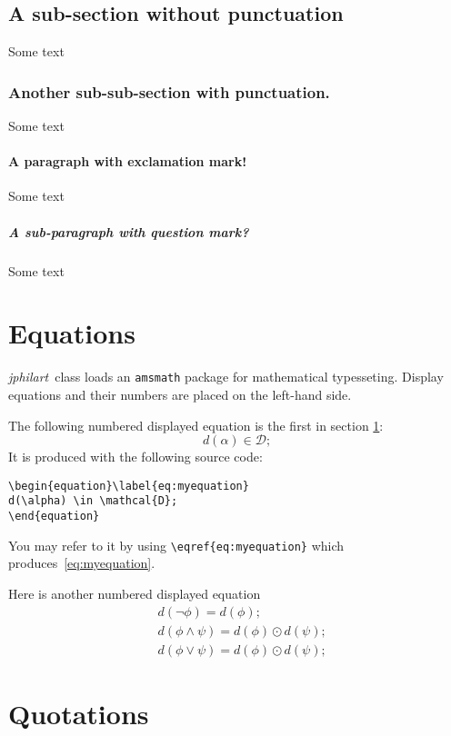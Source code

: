 \documentclass{jphilart}
\newcommand{\jphilart}{\emph{jphilart}\ } %
\begin{document}
\subsection{A sub-section without punctuation} Some text

\subsubsection{Another sub-sub-section with punctuation.} Some text

\paragraph{A paragraph with exclamation mark!} Some text

\subparagraph{A sub-paragraph with question mark?} Some text

\section{Equations}\label{se:mysection}

\jphilart class loads an \texttt{amsmath} package for mathematical typesseting.
Display equations and their numbers are placed on the left-hand side.

The following numbered displayed equation is the first in section \ref{se:mysection}:%
\begin{equation}\label{eq:myequation}
d(\alpha) \in \mathcal{D};
\end{equation}
It is produced with the following source code:
\begin{verbatim}
\begin{equation}\label{eq:myequation}
d(\alpha) \in \mathcal{D};
\end{equation}\end{verbatim}
You may refer to it by using \verb+\eqref{eq:myequation}+ which
produces~\eqref{eq:myequation}.

Here is another numbered displayed equation
\begin{equation}
\begin{split}
&d(\neg\phi) = d(\phi);\\
&d(\phi\wedge\psi) = d(\phi)\odot d(\psi);\\
&d(\phi\vee\psi) = d(\phi)\odot d(\psi);
\end{split}
\end{equation}

\section{Quotations}
\end{document}
